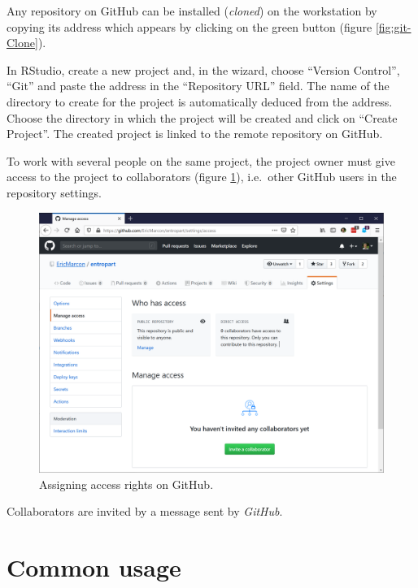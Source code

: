 \documentclass[
  12pt,
  american,
  a4paper,
  extrafontsizes,onecolumn,openright
  ]{memoir}
\begin{document}
\normalsize

Any repository on GitHub can be installed (\emph{cloned}) on the workstation by copying its address which appears by clicking on the green button (figure \ref{fig:git-Clone}).

In RStudio, create a new project and, in the wizard, choose \enquote{Version Control}, \enquote{Git} and paste the address in the \enquote{Repository URL} field.
The name of the directory to create for the project is automatically deduced from the address.
Choose the directory in which the project will be created and click on \enquote{Create Project}.
The created project is linked to the remote repository on GitHub.

To work with several people on the same project, the project owner must give access to the project to collaborators (figure \ref{fig:git-Access}), i.e.~other GitHub users in the repository settings.



\scriptsize

\begin{figure}

{\centering \includegraphics[width=0.8\linewidth]{images/git-Access} 

}

\caption{Assigning access rights on GitHub.}\label{fig:git-Access}
\end{figure}

\normalsize

Collaborators are invited by a message sent by \emph{GitHub}.

\hypertarget{common-usage}{%
\section{Common usage}\label{common-usage}}
\end{document}
